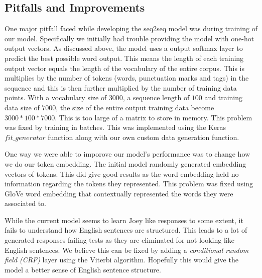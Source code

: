 \subsection{Pitfalls and Improvements}
One major pitfall faced while developing the seq2seq model was during training of our model. 
Specifically we initially had trouble providing the model with one-hot output vectors. 
As discussed above, the model uses a output softmax layer to predict the best possible word output. 
This means the length of each training output vector equals the length of the vocabulary of the entire corpus. 
This is multiplies by the number of tokens (words, punctuation marks and tags) in the sequence and this is then further multiplied by the number of training data points. 
With a vocabulary size of $3000$, a sequence length of $100$ and training data size of $7000$, the size of the entire output training data become $3000*100*7000$. 
This is too large of a matrix to store in memory. 
This problem was fixed by training in batches.
This was implemented using the Keras $fit\_generator$ function along with our own custom data generation function. 

One way we were able to imporove our model's performance was to change how we do our token embedding.
The initial model randomly generated embedding vectors of tokens. 
This did give good results as the word embedding held no information regarding the tokens they represented. 
This problem was fixed using GloVe word embedding that contextually represented the words they were associated to.
 
While the current model seems to learn Joey like responses to some extent, it fails to understand how English sentences are structured. 
This leads to a lot of generated responses failing tests as they are eliminated for not looking like English sentences. 
We believe this can be fixed by adding a \emph{conditional random field (CRF)} layer using the Viterbi algorithm.
Hopefully this would give the model a better sense of English sentence structure. 
   
